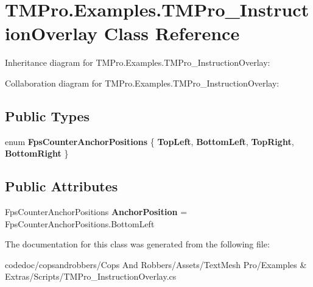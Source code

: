 \hypertarget{classTMPro_1_1Examples_1_1TMPro__InstructionOverlay}{}\section{T\+M\+Pro.\+Examples.\+T\+M\+Pro\+\_\+\+Instruction\+Overlay Class Reference}
\label{classTMPro_1_1Examples_1_1TMPro__InstructionOverlay}


Inheritance diagram for T\+M\+Pro.\+Examples.\+T\+M\+Pro\+\_\+\+Instruction\+Overlay\+:


Collaboration diagram for T\+M\+Pro.\+Examples.\+T\+M\+Pro\+\_\+\+Instruction\+Overlay\+:
\subsection*{Public Types}
\begin{DoxyCompactItemize}
\item 
\mbox{\label{classTMPro_1_1Examples_1_1TMPro__InstructionOverlay_a857c25d1c96e819dc39011d143ce3415}} 
enum {\bfseries Fps\+Counter\+Anchor\+Positions} \{ {\bfseries Top\+Left}, 
{\bfseries Bottom\+Left}, 
{\bfseries Top\+Right}, 
{\bfseries Bottom\+Right}
 \}
\end{DoxyCompactItemize}
\subsection*{Public Attributes}
\begin{DoxyCompactItemize}
\item 
\mbox{\label{classTMPro_1_1Examples_1_1TMPro__InstructionOverlay_a711b531b8ed7c421f67b1ee9b32b36dd}} 
Fps\+Counter\+Anchor\+Positions {\bfseries Anchor\+Position} = Fps\+Counter\+Anchor\+Positions.\+Bottom\+Left
\end{DoxyCompactItemize}


The documentation for this class was generated from the following file\+:\begin{DoxyCompactItemize}
\item 
codedoc/copsandrobbers/\+Cops And Robbers/\+Assets/\+Text\+Mesh Pro/\+Examples \& Extras/\+Scripts/T\+M\+Pro\+\_\+\+Instruction\+Overlay.\+cs\end{DoxyCompactItemize}
